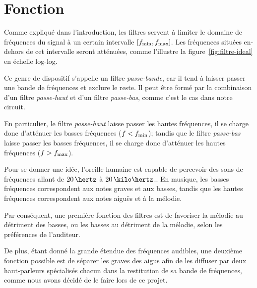 \section{Fonction}

Comme expliqué dans l'introduction, les filtres servent à limiter
le domaine de fréquences du signal à un certain intervalle
$[f_{\mathrm{min}},f_{\mathrm{max}}]$.
Les fréquences situées en-dehors de cet intervalle seront atténuées,
comme l'illustre la figure~\ref{fig:filtre-ideal} en échelle log-log.

Ce genre de dispositif s'appelle un filtre \emph{passe-bande},
car il tend à laisser passer une bande de fréquences et exclure le reste.
Il peut être formé par la combinaison d'un filtre
\emph{passe-haut} et d'un filtre \emph{passe-bas},\cite{high-low-pass-combined}
comme c'est le cas dans notre circuit.

En particulier,
le filtre \emph{passe-haut} laisse passer les hautes fréquences,
il se charge donc d'atténuer les basses fréquences ($f<f_{\mathrm{min}}$);
tandis que le filtre \emph{passe-bas} laisse passer les basses fréquences,
il se charge donc d'atténuer les hautes fréquences ($f>f_{\mathrm{max}}$).

Pour se donner une idée,
l'oreille humaine est capable de percevoir des sons de fréquences
allant de $20\,\hertz$ à $20\,\kilo\hertz$.\cite{hearing-range}.
En musique, les basses fréquences correspondent aux notes graves et aux basses,
tandis que les hautes fréquences correspondent aux notes aiguës et
à la mélodie.

Par conséquent, une première fonction des filtres est de
favoriser la mélodie au détriment des
basses, ou les basses au détriment de la mélodie, selon les préférences
de l'auditeur.

De plus, étant donné la grande étendue des fréquences audibles,
une deuxième fonction possible est de séparer les graves des aigus
afin de les diffuser par deux haut-parleurs spécialisés chacun
dans la restitution de sa bande de fréquences,
comme nous avons décidé de le faire lors de ce projet.
